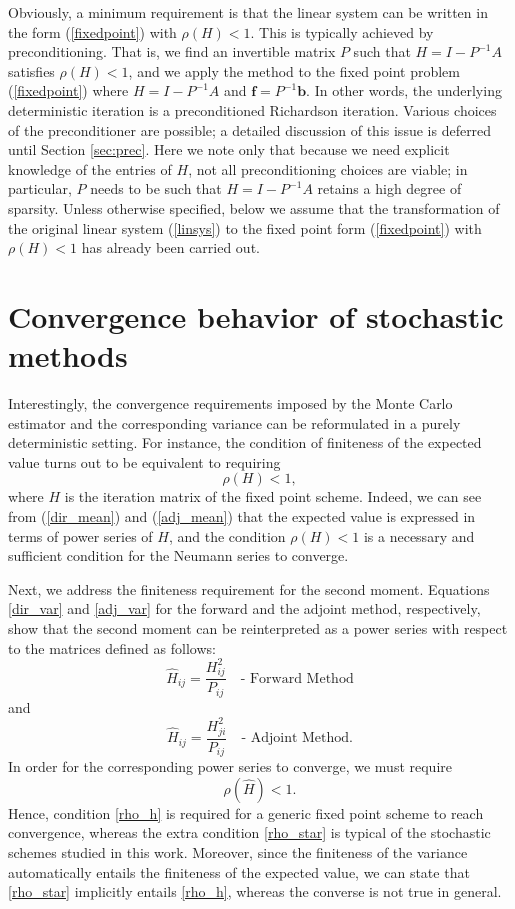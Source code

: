 \documentclass[final,leqno,onefignum,onetabnum]{siamltex1213}
\begin{document}
Obviously, a minimum requirement is that the linear system can be written
in the form (\ref{fixedpoint}) with $\rho(H) < 1$. This is typically achieved by
preconditioning. That is, we find an invertible matrix $P$ such that $H = I - P^{-1}A$
satisfies $\rho(H) < 1$, and we apply the method to the fixed point problem
(\ref{fixedpoint}) where $H = I - P^{-1}A$ and $\mathbf{f} = P^{-1}\mathbf{b}$. In
other words, the underlying deterministic iteration is a preconditioned
Richardson iteration. Various choices of the preconditioner are possible;
a detailed discussion of this issue is deferred until Section \ref{sec:prec}.
Here we note only that because we need explicit 
knowledge of the entries of $H$, not all preconditioning choices are
viable; in particular, $P$ needs to be such that $H = I - P^{-1}A$ retains
a high degree of sparsity. Unless otherwise specified, below we
assume that the transformation of the original linear system (\ref{linsys})
to the fixed point form (\ref{fixedpoint}) with $\rho(H)<1$ has already
been carried out.

\section{Convergence behavior of stochastic methods}
\label{sec:convergence}

Interestingly,
the convergence requirements imposed by the Monte Carlo estimator and
the corresponding variance can be reformulated in a purely deterministic
setting.
For instance, the condition of finiteness of the expected value turns out to 
be equivalent to requiring
\begin{equation}
 \rho(H)<1
 \label{rho_h},
\end{equation}
where $H$ is the iteration matrix of the fixed point scheme.
Indeed, we can see from (\ref{dir_mean}) and (\ref{adj_mean}) that the
expected value is expressed in terms of
power series of $H$, and the condition $\rho(H)<1$ 
is a necessary and sufficient condition for the Neumann series to
converge.

Next, we address the finiteness requirement for the second moment.
Equations \eqref{dir_var} and \eqref{adj_var}
for
the forward and the adjoint method, respectively, show that the second
moment can be reinterpreted as a power series with respect to the matrices
defined as follows:
\[
 \hat{H}_{ij}=\frac{H_{ij}^2}{P_{ij}} \quad \text{- Forward Method}
\]
and
\[
 \hat{H}_{ij}=\frac{H_{ji}^2}{P_{ij}} \quad \text{- Adjoint Method}.
\]
In order for the corresponding power series to
converge, we must require
\begin{equation}
 \rho(\hat{H})<1.
 \label{rho_star}
\end{equation}
Hence, condition \eqref{rho_h} is required for a generic fixed point scheme to
reach convergence, whereas the extra condition \eqref{rho_star} is typical of
the stochastic schemes studied in this work.
Moreover, since the finiteness of the variance automatically entails the 
finiteness of the expected value, we can state that \eqref{rho_star} 
implicitly entails \eqref{rho_h}, whereas the converse is not true in 
general.
\end{document}
